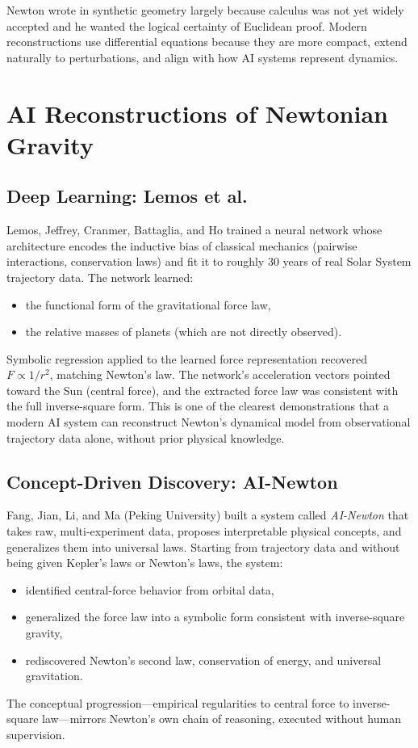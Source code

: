 \documentclass[12pt]{article}
\begin{document}
Newton wrote in synthetic geometry largely because calculus was not yet
widely accepted and he wanted the logical certainty of Euclidean proof.
Modern reconstructions use differential equations because they are more
compact, extend naturally to perturbations, and align with how AI systems
represent dynamics.

\section{AI Reconstructions of Newtonian Gravity}
\label{sec:ai}

\subsection{Deep Learning: Lemos et al.}

Lemos, Jeffrey, Cranmer, Battaglia, and Ho
trained a neural network whose architecture encodes the inductive bias of
classical mechanics (pairwise interactions, conservation laws) and fit it to
roughly 30 years of real Solar System trajectory data.
The network learned:
\begin{itemize}
  \item the functional form of the gravitational force law,
  \item the relative masses of planets (which are not directly observed).
\end{itemize}
Symbolic regression applied to the learned force representation recovered
$F \propto 1/r^{2}$, matching Newton's law.
The network's acceleration vectors pointed toward the Sun (central force),
and the extracted force law was consistent with the full inverse-square form.
This is one of the clearest demonstrations that a modern AI system can
reconstruct Newton's dynamical model from observational trajectory data
alone, without prior physical knowledge.

\subsection{Concept-Driven Discovery: AI-Newton}

Fang, Jian, Li, and Ma (Peking University) built a system called
\textit{AI-Newton} that takes raw, multi-experiment data, proposes
interpretable physical concepts, and generalizes them into universal laws.
Starting from trajectory data and without being given Kepler's laws or
Newton's laws, the system:
\begin{itemize}
  \item identified central-force behavior from orbital data,
  \item generalized the force law into a symbolic form consistent with
        inverse-square gravity,
  \item rediscovered Newton's second law, conservation of energy, and
        universal gravitation.
\end{itemize}
The conceptual progression---empirical regularities to central force to
inverse-square law---mirrors Newton's own chain of reasoning, executed
without human supervision.
\end{document}
